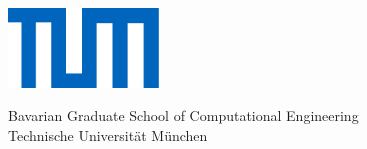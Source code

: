 


\def\bcorcor{0.15cm}
\addtolength{\hoffset}{\bcorcor}

\thispagestyle{empty}

 \vspace{10mm}
\begin{center}
	       \includegraphics[width=4cm]{styles/tum_logo.png}
	   
	   \vspace{5mm}     
	   \huge Bavarian Graduate School of Computational Engineering \\%
	   \vspace{0.5cm}
	 \large Technische Universit{\"a}t M{\"u}nchen\\
        
	\end{center}
		

